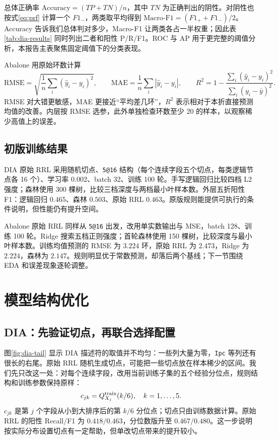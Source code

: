 \documentclass[UTF8,a4paper,11pt]{ctexart}
\begin{document}
总体正确率 $\mathrm{Accuracy}=(TP+TN)/n$，其中 $TN$ 为正确判出的阴性。对阴性也按式\eqref{eq:prf} 计算一个 $F1_-$，两类取平均得到 $\mathrm{Macro\text{-}F1}=(F1_++F1_-)/2$。Accuracy 告诉我们总体判对多少，Macro-F1 让两类各占一半权重；因此表\ref{tab:dia-results} 同时列出二者和阳性 P/R/F1。ROC 与 AP 用于更完整的阈值分析，本报告主表聚焦固定阈值下的分类表现。

Abalone 用原始环数计算
\begin{equation}
\mathrm{RMSE}=\sqrt{\frac1n\sum_i(\hat y_i-y_i)^2},\qquad
\mathrm{MAE}=\frac1n\sum_i|\hat y_i-y_i|,\qquad
R^2=1-\frac{\sum_i(\hat y_i-y_i)^2}{\sum_i(y_i-\bar y)^2}.
\label{eq:regmetrics}
\end{equation}
RMSE 对大错更敏感，MAE 更接近“平均差几环”，$R^2$ 表示相对于本折直接预测均值的改善。内层按 RMSE 选参，此外单独检查环数至少 20 的样本，以观察稀少高值上的误差。

\subsection{初版训练结果}

DIA 原始 RRL 采用随机切点、\texttt{5@16} 结构（每个连续字段五个切点，每类逻辑节点各 16 个）、学习率 0.002、batch 32、训练 100 轮。手写逻辑回归比较四档 L2 强度；森林使用 300 棵树，比较三档深度与两档最小叶样本数。外层五折阳性 F1：逻辑回归 $0.465$、森林 $0.503$、原始 RRL $0.463$。原版规则能提供可执行的条件说明，但性能仍有提升空间。

Abalone 原始 RRL 同样从 \texttt{5@16} 出发，改用单实数输出与 MSE，batch 128、训练 100 轮。Ridge 搜索五档正则强度；首轮森林使用 150 棵树，比较深度与最小叶样本数。训练均值预测的 RMSE 为 $3.224$ 环，原始 RRL 为 $2.473$，Ridge 为 $2.224$，森林为 $2.147$。规则明显优于常数预测，却落后两个基线；下一节围绕 EDA 和误差现象逐轮调整。

\section{模型结构优化}
\subsection{DIA：先验证切点，再联合选择配置}

图\ref{fig:dia-tail} 显示 DIA 描述符的取值并不均匀：一些列大量为零，\texttt{Ipc} 等列还有很长的右尾。原始 RRL 随机生成切点，可能把一些切点放在样本稀少的区间。我们先只改这一处：对每个连续字段，改用当前训练子集的五个经验分位点，规则结构和训练参数保持原样：
\begin{equation}
c_{jk}=Q_{X_j}^{\rm train}(k/6),\quad k=1,\ldots,5.
\label{eq:quantcut}
\end{equation}
$c_{jk}$ 是第 $j$ 个字段从小到大排序后的第 $k/6$ 分位点；切点只由训练数据计算。原始 RRL 的阳性 Recall/F1 为 $0.418/0.463$，分位数版升至 $0.467/0.480$。这一步说明按实际分布设置切点有一定帮助，但单改切点带来的提升较小。
\end{document}

